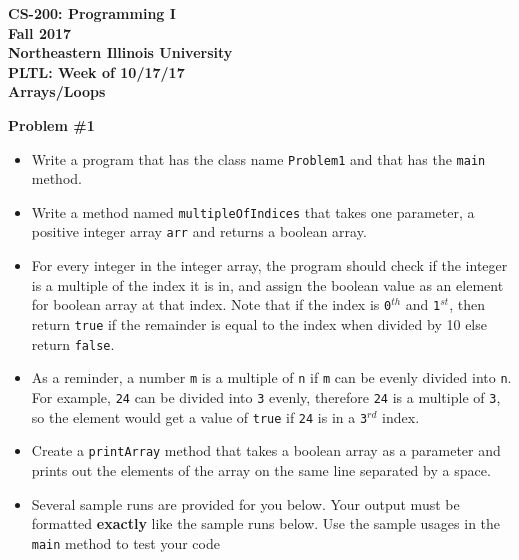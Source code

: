 \documentclass[12pt]{article}
\begin{document}
	\begin{center}
		\textbf{CS-200: Programming I}\\
		\textbf{Fall 2017}\\
		\textbf{Northeastern Illinois University}\\
		\textbf{PLTL: Week of 10/17/17}\\
		\textbf{Arrays/Loops}
	\end{center}
	
	\noindent\textbf{Problem \#1}
	\begin{itemize}
		\item Write a program that has the class name \texttt{Problem1} and that has the \texttt{main} method. 
		\item Write a method named \texttt{multipleOfIndices} that takes one parameter, a positive integer array \texttt{arr} and returns a boolean array. 
		\item For every integer in the integer array, the program should check if the integer is a multiple of the index it is in, and assign the boolean value as an element for boolean array at that index. Note that  if the index is \texttt{0$^{th}$} and \texttt{1$^{st}$}, then return \texttt{true} if the remainder is equal to the index when divided by 10 else return \texttt{false}.
		\item As a reminder, a number \texttt{m} is a multiple of \texttt{n} if \texttt{m} can be evenly divided into \texttt{n}. For example, \texttt{24} can be divided into \texttt{3} evenly, therefore \texttt{24} is a multiple of \texttt{3}, so the element would get a value of \texttt{true} if \texttt{24} is in a \texttt{3$^{rd}$} index. 
		\item Create a \texttt{printArray} method that takes a boolean array as a parameter and prints out the elements of the array on the same line separated by a space.
		\item Several sample runs are provided for you below. Your output must be formatted \textbf{exactly} like the sample runs below. Use the sample usages in the \texttt{main} method to test your code 
	\end{itemize}
\end{document}

